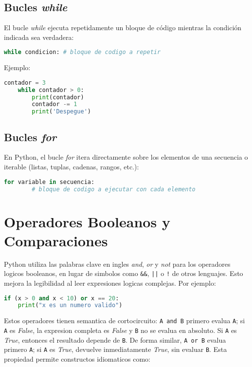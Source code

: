 
\subsection*{Bucles \textit{while}} El bucle \textit{while} ejecuta repetidamente un bloque de código mientras la condición indicada sea verdadera: 

\begin{lstlisting}[language=Python, caption={Estructura de bucle while.}] 
    while condicion: # bloque de codigo a repetir 
\end{lstlisting} 


Ejemplo: 

\begin{lstlisting}[language=Python, caption={Ejemplo de bucle while.}] 
    contador = 3 
    while contador > 0:
        print(contador) 
        contador -= 1 
        print('Despegue') 
\end{lstlisting} 


\subsection*{Bucles \textit{for}} En Python, el bucle \textit{for} itera directamente sobre los elementos de una secuencia o iterable (listas, tuplas, cadenas, rangos, etc.): 
\begin{lstlisting}[language=Python, caption={Estructura de bucle for.}] 
    for variable in secuencia: 
        # bloque de codigo a ejecutar con cada elemento 
\end{lstlisting} 
\section{Operadores Booleanos y Comparaciones}

Python utiliza las palabras clave en ingles \textit{and}, \textit{or} y \textit{not} para los operadores logicos booleanos, en lugar de simbolos como \texttt{\&\&}, \texttt{||} o \texttt{!} de otros lenguajes. Esto mejora la legibilidad al leer expresiones logicas complejas. Por ejemplo:

\begin{lstlisting}[language=Python, caption={Ejemplo de operadores booleanos en Python}]
if (x > 0 and x < 10) or x == 20:
    print("x es un numero valido")
\end{lstlisting}

Estos operadores tienen semantica de cortocircuito: \texttt{A and B} primero evalua \texttt{A}; si \texttt{A} es \textit{False}, la expresion completa es \textit{False} y \texttt{B} no se evalua en absoluto. Si \texttt{A} es \textit{True}, entonces el resultado depende de \texttt{B}. De forma similar, \texttt{A or B} evalua primero \texttt{A}; si \texttt{A} es \textit{True}, devuelve inmediatamente \textit{True}, sin evaluar \texttt{B}. Esta propiedad permite constructos idiomaticos como:

